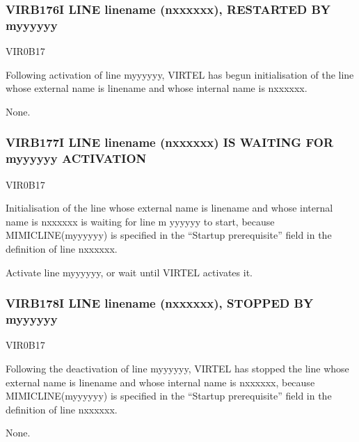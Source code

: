 \documentclass[letterpaper,10pt,english]{sphinxmanual}
\begin{document}
\subsubsection{VIRB176I LINE linename (n\sphinxhyphen{}xxxxxx), RESTARTED BY m\sphinxhyphen{}yyyyyy}
\label{\detokenize{messages:virb176i-line-linename-n-xxxxxx-restarted-by-m-yyyyyy}}\begin{description}
\sphinxAtStartPar
VIR0B17

\sphinxAtStartPar
Following activation of line m\sphinxhyphen{}yyyyyy, VIRTEL has begun initialisation of the line whose external name is linename and whose internal name is n\sphinxhyphen{}xxxxxx.

\sphinxAtStartPar
None.

\end{description}


\subsubsection{VIRB177I LINE linename (n\sphinxhyphen{}xxxxxx) IS WAITING FOR m\sphinxhyphen{}yyyyyy ACTIVATION}
\label{\detokenize{messages:virb177i-line-linename-n-xxxxxx-is-waiting-for-m-yyyyyy-activation}}\begin{description}
\sphinxAtStartPar
VIR0B17

\sphinxAtStartPar
Initialisation of the line whose external name is linename and whose internal name is n\sphinxhyphen{}xxxxxx is waiting for line m\sphinxhyphen{} yyyyyy to start, because MIMIC\sphinxhyphen{}LINE(m\sphinxhyphen{}yyyyyy) is specified in the “Startup prerequisite” field in the definition of line n\sphinxhyphen{}xxxxxx.

\sphinxAtStartPar
Activate line m\sphinxhyphen{}yyyyyy, or wait until VIRTEL activates it.

\end{description}


\subsubsection{VIRB178I LINE linename (n\sphinxhyphen{}xxxxxx), STOPPED BY m\sphinxhyphen{}yyyyyy}
\label{\detokenize{messages:virb178i-line-linename-n-xxxxxx-stopped-by-m-yyyyyy}}\begin{description}
\sphinxAtStartPar
VIR0B17

\sphinxAtStartPar
Following the deactivation of line m\sphinxhyphen{}yyyyyy, VIRTEL has stopped the line whose external name is linename and whose internal name is n\sphinxhyphen{}xxxxxx, because MIMIC\sphinxhyphen{}LINE(m\sphinxhyphen{}yyyyyy) is specified in the “Startup prerequisite” field in the definition of line n\sphinxhyphen{}xxxxxx.

\sphinxAtStartPar
None.

\end{description}
\end{document}
